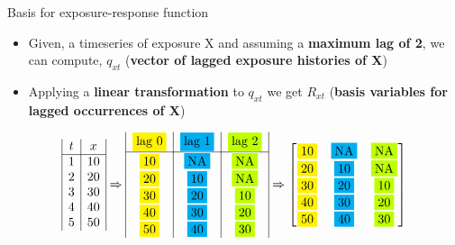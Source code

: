 \documentclass[english]{beamer}
\newcommand{\alertblue}[1]{{\color{blue}#1}}
\begin{document}
\begin{frame}{Basis for exposure-response function}
    \begin{itemize}
        \item Given, a timeseries of exposure X and assuming a \alertblue{\textbf{maximum lag of 2}},  we can compute, \alertblue{\(q_{xt}\)} (\alertblue{\textbf{vector of lagged exposure histories of X}})
        \item Applying a \alertblue{\textbf{linear transformation}} to \alertblue{\( q_{xt} \) } we get \alertblue{\( R_{xt}\)} (\alertblue{\textbf{basis variables for lagged occurrences of X}})
    \end{itemize}
    \vspace{0.5cm}
\[
\begin{array}{|c|c|}
        t & {x} \\ \hline
        1 & 10  \\
        2 & 20  \\
        3 & 30  \\
        4 & 40  \\
        5 & 50  
\end{array} 
\Rightarrow 
\begin{array}{|c|c|c|c|}
        \fcolorbox{white}{yellow}{lag 0} & \fcolorbox{white}{cyan}{lag 1} & \fcolorbox{white}{lime}{lag 2} \\ \hline
        \fcolorbox{white}{yellow}{10} & \fcolorbox{white}{cyan}{NA} & \fcolorbox{white}{lime}{NA} \\
        \fcolorbox{white}{yellow}{20}  & \fcolorbox{white}{cyan}{10} & \fcolorbox{white}{lime}{NA} \\
        \fcolorbox{white}{yellow}{30}  & \fcolorbox{white}{cyan}{20} & \fcolorbox{white}{lime}{10} \\
        \fcolorbox{white}{yellow}{40}  & \fcolorbox{white}{cyan}{30} & \fcolorbox{white}{lime}{20}  \\
        \fcolorbox{white}{yellow}{50}  & \fcolorbox{white}{cyan}{40} & \fcolorbox{white}{lime}{30} 
\end{array}
\Rightarrow  
\begin{bmatrix}
        \fcolorbox{white}{yellow}{10} & \fcolorbox{white}{cyan}{NA} & \fcolorbox{white}{lime}{NA} \\
        \fcolorbox{white}{yellow}{20} & \fcolorbox{white}{cyan}{10} & \fcolorbox{white}{lime}{NA} \\
        \fcolorbox{white}{yellow}{30} & \fcolorbox{white}{cyan}{20} & \fcolorbox{white}{lime}{10} \\
        \fcolorbox{white}{yellow}{40} & \fcolorbox{white}{cyan}{30} & \fcolorbox{white}{lime}{20} \\
        \fcolorbox{white}{yellow}{50} & \fcolorbox{white}{cyan}{40} & \fcolorbox{white}{lime}{30} \\
\end{bmatrix}
\]
\end{frame}
\end{document}
